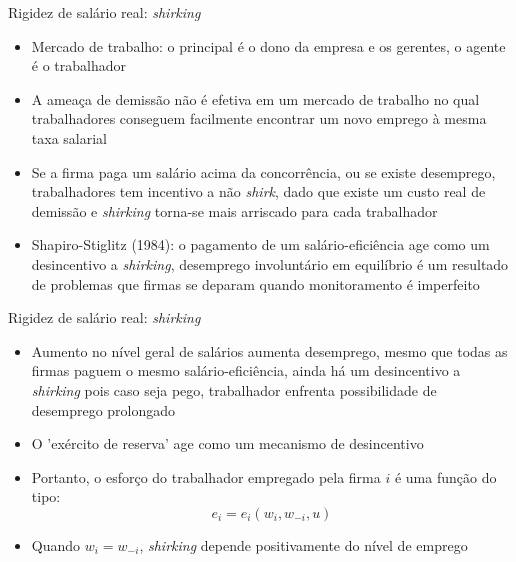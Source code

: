 \documentclass[10pt]{beamer}
\begin{document}
\begin{frame}{Rigidez de salário real: \emph{shirking}}
    \begin{itemize}
        \item Mercado de trabalho: o principal é o dono da empresa e os gerentes, o agente é o trabalhador\bigskip
        \item A ameaça de demissão não é efetiva em um mercado de trabalho no qual trabalhadores conseguem facilmente encontrar um novo emprego à mesma taxa salarial\bigskip
        \item Se a firma paga um salário acima da concorrência, ou se existe desemprego, trabalhadores tem incentivo a não \emph{shirk}, dado que existe um custo real de demissão e \emph{shirking} torna-se mais arriscado para cada trabalhador\bigskip
        \item Shapiro-Stiglitz (1984): o pagamento de um salário-eficiência age como um desincentivo a \emph{shirking}, desemprego involuntário em equilíbrio é um resultado de problemas que firmas se deparam quando monitoramento é imperfeito 
    \end{itemize}
\end{frame}

\begin{frame}{Rigidez de salário real: \emph{shirking}}
    \begin{itemize}
        \item Aumento no nível geral de salários aumenta desemprego, mesmo que todas as firmas paguem o mesmo salário-eficiência, ainda há um desincentivo a \emph{shirking} pois caso seja pego, trabalhador enfrenta possibilidade de desemprego prolongado\bigskip
        \item O 'exército de reserva' age como um mecanismo de desincentivo\bigskip
        \item Portanto, o esforço do trabalhador empregado pela firma $i$ é uma função do tipo:
        \begin{equation}
            e_i = e_i(w_i, w_{-i}, u)
        \end{equation}
        \item Quando $w_i = w_{-i}$, \emph{shirking} depende positivamente do nível de emprego
    \end{itemize}
\end{frame}
\end{document}
